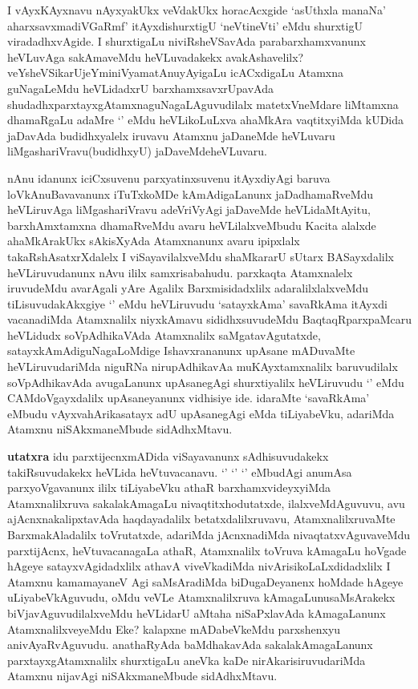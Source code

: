 
\begin{artha}
I vAyxKAyxnavu nAyxyakUkx veVdakUkx horacAcxgide `asUthxla manaNa' aharxsavxmadiVGaRmf' itAyxdishurxtigU  `neVtineVti' eMdu shurxtigU viradadhxvAgide. I shurxtigaLu niviRsheVSavAda parabarxhamxvanunx heVLuvAga sakAmaveMdu heVLuvadakekx avakAshavelilx? veYsheVSikarUjeYminiVyamatAnuyAyigaLu icACxdigaLu Atamxna guNagaLeMdu heVLidadxrU barxhamxsavxrUpavAda shudadhxparxtayxgAtamxnaguNagaLAguvudilalx matetxVneMdare liMtamxna dhamaRgaLu adaMre `\stext' eMdu heVLikoLuLxva ahaMkAra vaqtitxyiMda kUDida jaDavAda budidhxyalelx iruvavu Atamxnu jaDaneMde heVLuvaru liMgashariVravu(budidhxyU) jaDaveMdeheVLuvaru.
\end{artha}

\begin{artha}
nAnu idanunx iciCxsuvenu parxyatinxsuvenu itAyxdiyAgi baruva loVkAnuBavavanunx iTuTxkoMDe kAmAdigaLanunx jaDadhamaRveMdu heVLiruvAga liMgashariVravu adeVriVyAgi jaDaveMde heVLidaMtAyitu, barxhAmxtamxna dhamaRveMdu avaru heVLilalxveMbudu Kacita alalxde ahaMkArakUkx sAkisXyAda Atamxnanunx avaru ipipxlalx takaRshAsatxrXdalelx I viSayavilalxveMdu shaMkararU sUtarx BASayxdalilx heVLiruvudanunx nAvu ililx samxrisabahudu. parxkaqta Atamxnalelx iruvudeMdu avarAgali yAre Agalilx Barxmisidadxlilx adaralilxlalxveMdu tiLisuvudakAkxgiye `\stext' eMdu heVLiruvudu `satayxkAma' savaRkAma itAyxdi vacanadiMda Atamxnalilx niyxkAmavu sididhxsuvudeMdu BaqtaqRparxpaMcaru heVLidudx soVpAdhikaVAda Atamxnalilx saMgatavAgutatxde, satayxkAmAdiguNagaLoMdige Ishavxrananunx upAsane mADuvaMte heVLiruvudariMda niguRNa nirupAdhikavAa muKAyxtamxnalilx baruvudilalx soVpAdhikavAda avugaLanunx upAsanegAgi shurxtiyalilx heVLiruvudu `\stext' eMdu CAMdoVgayxdalilx upAsaneyanunx vidhisiye ide. idaraMte `savaRkAma' eMbudu vAyxvahArikasatayx adU upAsanegAgi eMda tiLiyabeVku, adariMda Atamxnu niSAkxmaneMbude sidAdhxMtavu.
\end{artha}

\begin{artha}
 \textbf{utatxra} idu parxtijecnxmADida viSayavanunx sAdhisuvudakekx takiRsuvudakekx heVLida heVtuvacanavu. `\stext' `\stext' `\stext' eMbudAgi anumAsa parxyoVgavanunx ililx tiLiyabeVku athaR barxhamxvideyxyiMda Atamxnalilxruva sakalakAmagaLu nivaqtitxhodutatxde, ilalxveMdAguvuvu, avu ajAcnxnakalipxtavAda haqdayadalilx betatxdalilxruvavu, AtamxnalilxruvaMte BarxmakAladalilx toVrutatxde, adariMda jAcnxnadiMda nivaqtatxvAguvaveMdu parxtijAcnx, heVtuvacanagaLa athaR, Atamxnalilx toVruva kAmagaLu hoVgade hAgeye satayxvAgidadxlilx athavA viveVkadiMda nivArisikoLaLxdidadxlilx I Atamxnu kamamayaneV Agi saMsAradiMda biDugaDeyanenx hoMdade hAgeye uLiyabeVkAguvudu, oMdu veVLe Atamxnalilxruva kAmagaLunusaMsArakekx biVjavAguvudilalxveMdu heVLidarU aMtaha niSaPxlavAda kAmagaLanunx AtamxnalilxveyeMdu Eke? kalapxne mADabeVkeMdu parxshenxyu anivAyaRvAguvudu. anathaRyAda baMdhakavAda sakalakAmagaLanunx parxtayxgAtamxnalilx shurxtigaLu aneVka kaDe nirAkarisiruvudariMda Atamxnu nijavAgi niSAkxmaneMbude sidAdhxMtavu.
\end{artha}

